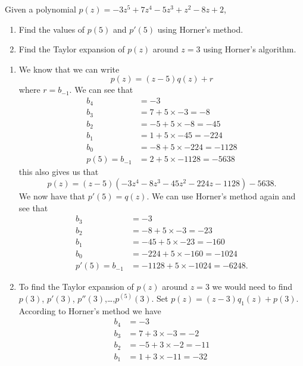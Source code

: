 \documentclass[11pt, a4paper]{article}
\begin{document}
\begin{exercise}
  Given a polynomial $p(z) = - 3 z^5 + 7 z^4 - 5 z^3 + z^2 - 8 z + 2$,
  \begin{enumerate}
    \item[(1)] Find the values of $p(5)$ and $p'(5)$ using Horner's method.
    \item[(2)] Find the Taylor expansion of $p(z)$ around $z = 3$ using
      Horner's algorithm.
  \end{enumerate}
\end{exercise}
\begin{solution} \phantom{}
\begin{enumerate}
  \item[(1)] We know that we can write
    \[
      p(z) = (z - 5) q(z) + r
    \]
  where $r = b_{-1}$.
  We can see that
  \begin{align*}
    b_4 &= -3 \\
    b_3 &= 7 + 5 \times -3 = -8 \\
    b_2 &= -5 + 5 \times -8 = -45 \\
    b_1 &= 1 + 5 \times -45 = -224 \\
    b_0 &= -8 + 5 \times -224 = -1128 \\
    p(5) = b_{-1} &= 2 + 5 \times -1128 = -5638 
  \end{align*}
  this also gives us that
  \[
    p(z) = (z - 5)(-3 z^4 -8 z^3 - 45 z^2 - 224z - 1128) - 5638.
  \]
  We now have that $p'(5) = q(z)$.
  We can use Horner's method again and see that
  \begin{align*}
    b_3 &= -3 \\
    b_2 &= -8 + 5 \times -3  = -23\\
    b_1 &= -45 + 5 \times -23 = -160 \\
    b_0 &= -224 + 5 \times -160 = -1024 \\
    p'(5) = b_{-1} &= -1128 + 5 \times -1024 = -6248.
  \end{align*}
  \item[(2)] To find the Taylor expansion of $p(z)$ around $z = 3$ we would
    need to find $p(3)$, $p'(3)$, $p''(3)$,\dots,$p^{(5)}(3)$.
    Set $p(z) = (z - 3) q_1(z) + p(3)$.
    According to Horner's method we have
  \begin{align*}
    b_4 &= -3 \\
    b_3 &= 7 + 3 \times -3 = -2 \\
    b_2 &= -5 + 3 \times -2 = -11 \\
    b_1 &= 1 + 3 \times -11 = -32 \\

\end{align*}
\end{enumerate}
\end{solution}
\end{document}
